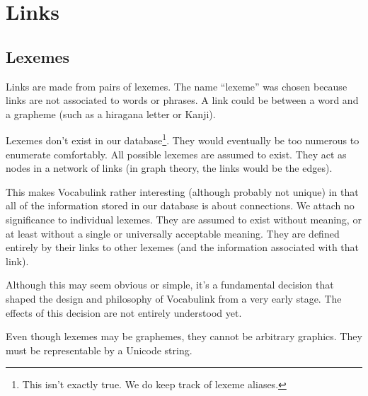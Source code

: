 \chapter{Links}

\section{Lexemes}

Links are made from pairs of lexemes. The name ``lexeme'' was chosen because
links are not associated to words or phrases. A link could be between a word
and a grapheme (such as a hiragana letter or Kanji).

Lexemes don't exist in our database\footnote{This isn't exactly true. We do
keep track of lexeme aliases.}. They would eventually be too numerous to
enumerate comfortably. All possible lexemes are assumed to exist. They act as
nodes in a network of links (in graph theory, the links would be the edges).

This makes Vocabulink rather interesting (although probably not unique) in that
all of the information stored in our database is about connections. We attach
no significance to individual lexemes. They are assumed to exist without
meaning, or at least without a single or universally acceptable meaning. They
are defined entirely by their links to other lexemes (and the information
associated with that link).

Although this may seem obvious or simple, it's a fundamental decision that
shaped the design and philosophy of Vocabulink from a very early stage. The
effects of this decision are not entirely understood yet.

Even though lexemes may be graphemes, they cannot be arbitrary graphics. They
must be representable by a Unicode string.
